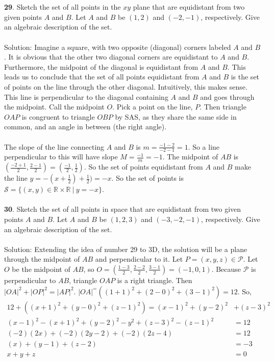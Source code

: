 \documentclass[12pt]{amsbook}
\begin{document}
\\
\\
{\small\bf 29}. Sketch the set of all points in the $xy$ plane
that are equidistant from two given points $A$ and $B$.
Let $A$ and $B$ be $(1,2)$ and $(-2,-1)$, respectively.
Give an algebraic description of the set. 
\\
\\
{\sc Solution}: Imagine a square, with two opposite (diagonal) corners labeled $A$ and $B$. It is obvious that the other two diagonal corners are equidistant to $A$ and $B$. Furthermore, the midpoint of the diagonal is equidistant from $A$ and $B$. This leads us to conclude that the set of all points equidistant from $A$ and $B$ is the set of points on the line through the other diagonal. Intuitively, this makes sense. This line is perpendicular to the diagonal containing $A$ and $B$ and goes through the midpoint. Call the midpoint $O$. Pick a point on the line, $P$. Then triangle $OAP$ is congruent to triangle $OBP$ by SAS, as they share the same side in common, and an angle in between (the right angle).
\\
\\
The slope of the line connecting $A$ and $B$ is $m=\frac{-1-2}{-2-1}=1$. So a line perpendicular to this will have slope $M=\frac{-1}{m}=-1$. The midpoint of $AB$ is $(\frac{-2+1}{2},\frac{2-1}{2})=(\frac{-1}{2},\frac{1}{2})$. So the set of points equidistant from $A$ and $B$ make the line $y=-(x+\frac{1}{2})+\frac{1}{2})=-x$. So the set of points is $\mathcal{S}=\{(x,y) \in \mathbb{R} \times \mathbb{R} \ | \ y=-x \}$.
\\
\\
{\small\bf 30}. Sketch the set of all points in space that are equidistant from two given points $A$ and $B$. Let $A$ and $B$ be $(1,2,3)$ and $(-3,-2,-1)$, respectively. Give an algebraic description of the set.
\\
\\
{\sc Solution}: Extending the idea of number 29 to 3D, the solution will be a plane through the midpoint of $AB$ and perpendicular to it. Let $P=(x,y,z) \in \mathcal{P}$. Let $O$ be the midpoint of $AB$, so $O=(\frac{1-3}{2},\frac{2-2}{2},\frac{3-1}{2}   )=(-1,0,1)$. Because $\mathcal{P}$ is perpendicular to $AB$, triangle $OAP$ is a right triangle. Then $|OA|^2+|OP|^2=|AP|^2$. $|OA|^=((1+1)^2+(2-0)^2+(3-1)^2)=12$. So,
\begin{align*}
12+((x+1)^2+(y-0)^2+(z-1)^2)=(x-1)^2+(y-2)^2&+(z-3)^2 \\
(x-1)^2-(x+1)^2+(y-2)^2-y^2+(z-3)^2-(z-1)^2&=12\\
(-2)(2x)+(-2)(2y-2)+(-2)(2z-4)&=12 \\
(x)+(y-1)+(z-2)&=-3 \\
x+y+z&=0
\end{align*}
\end{document}

